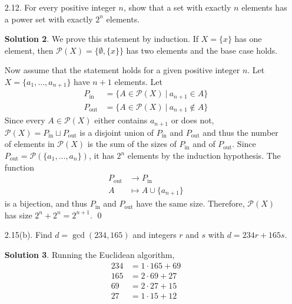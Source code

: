\documentclass{article}
\newcommand{\PP}{\mathcal{P}}
\theoremstyle{definition}
\newtheorem*{solution}{Solution}
\begin{document}
\begin{enumerate}
\begin{solution}
Suppose that $1 + 2 + 2^2 + \dots + 2^{n-1} = 2^n - 1$.  Then
\begin{align*}
1 + 2 + 2^2 + \dots + 2^{n-1} + 2^n &= (2^n - 1) + 2^n \\
&= 2 \cdot 2^n - 1 \\
&= 2^{n+1} - 1.
\end{align*}
The result then holds by induction. \qed
\end{solution}
\item[2.12.] For every positive integer $n$, show that a set with exactly $n$ elements has a power set with exactly $2^n$ elements.
\begin{solution}
We prove this statement by induction.  If $X = \{x\}$ has one element, then $\PP(X) = \{\emptyset, \{x\}\}$ has two elements and the base case holds.

Now assume that the statement holds for a given positive integer $n$.  Let $X = \{a_1, \dots, a_{n+1}\}$ have $n+1$ elements.  Let
\begin{align*}
P_{\mathrm{in}} &= \{A \in \PP(X)\ \vert\ a_{n+1} \in A\} \\
P_{\mathrm{out}} &= \{A \in \PP(X)\ \vert\ a_{n+1} \not\in A\}
\end{align*}
Since every $A \in \PP(X)$ either contains $a_{n+1}$ or does not, $\PP(X) = P_{\mathrm{in}} \sqcup P_{\mathrm{out}}$ is a disjoint union of $P_{\mathrm{in}}$ and $P_{\mathrm{out}}$ and thus the number of elements in $\PP(X)$ is the sum of the sizes of $P_{\mathrm{in}}$ and of $P_{\mathrm{out}}$.  Since $P_{\mathrm{out}} = \PP(\{a_1, \dots, a_n\})$, it has $2^n$ elements by the induction hypothesis.  The function
\begin{align*}
P_{\mathrm{out}} &\to P_{\mathrm{in}} \\
A &\mapsto A \cup \{a_{n+1}\}
\end{align*}
is a bijection, and thus $P_{\mathrm{in}}$ and $P_{\mathrm{out}}$ have the same size.  Therefore, $\PP(X)$ has size $2^n + 2^n = 2^{n+1}$. \qed
\end{solution}
\item[2.15(b).] Find $d = \gcd(234, 165)$ and integers $r$ and $s$ with $d = 234r + 165s$.
\begin{solution}
Running the Euclidean algorithm,
\begin{align*}
234 &= 1 \cdot 165 + 69 \\
165 &= 2 \cdot 69 + 27 \\
69 &= 2 \cdot 27 + 15 \\
27 &= 1 \cdot 15 + 12 \\

\end{align*}
\end{solution}
\end{enumerate}
\end{document}
